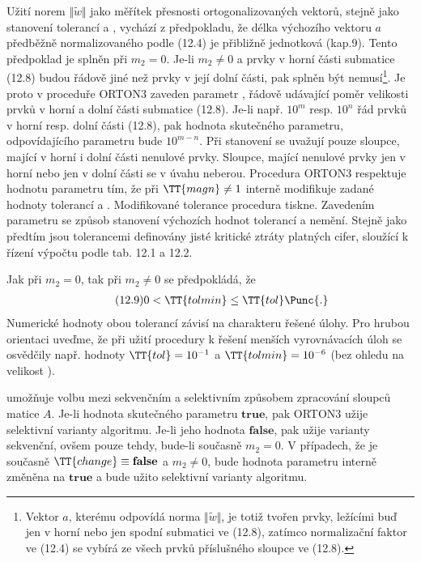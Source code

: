 Užití norem $\Vert\widetilde w\Vert$ jako měřítek přesnosti
ortogonalizovaných vektorů, stejně jako stanovení tolerancí 
a , vychází z předpokladu, že délka výchozího vektoru $a$
předběžně normalizovaného podle (12.4) je přibližně jednotková
(kap.9). Tento předpoklad je splněn při $m_2=0$. Je-li $m_2\ne0$
a prvky v horní části submatice (12.8) budou řádově jiné než prvky
v její dolní
části, pak splněn být nemusí\footnote
{
Vektor $a$, kterému odpovídá norma $\Vert\widetilde w\Vert$,
je totiž tvořen prvky, ležícími buď jen v horní nebo jen spodní
submatici ve (12.8), zatímco normalizační faktor ve (12.4)
se vybírá ze všech prvků příslušného sloupce ve (12.8).
}.
%
Je proto v proceduře ORTON3 zaveden
%
 parametr
, řádově udávající poměr velikosti prvků v horní
a dolní části submatice (12.8). Je-li např. $10^m$ resp. $10^n$ řád
prvků v horní resp. dolní části (12.8), pak hodnota skutečného
parametru, odpovídajícího parametru  bude $10^{m-n}$.  Při
stanovení  se uvažují pouze sloupce, mající v horní i dolní
části nenulové prvky. Sloupce, mající nenulové prvky jen v horní nebo
jen v dolní části se v úvahu neberou. Procedura ORTON3 respektuje
hodnotu parametru  tím, že při $\TT{magn}\ne1$ interně
modifikuje zadané hodnoty tolerancí 
a . Modifikované tolerance procedura tiskne. Zavedením
parametru  se způsob stanovení výchozích hodnot
tolerancí  a  nemění.  Stejně jako předtím jsou
tolerancemi definovány jisté kritické ztráty platných cifer, sloužící
k řízení výpočtu podle tab. 12.1 a 12.2.


Jak při $m_2=0$, tak při $m_2\ne0$ se předpokládá, že
%
\begin{align*}
   \tag{12.9}  0 < \TT{tolmin} \le \TT{tol}\Punc{.}
\end{align*}
%
Numerické hodnoty obou tolerancí závisí na charakteru řešené
úlohy. Pro hrubou orientaci uveďme, že při užití procedury k řešení
menších vyrovnávacích úloh se osvědčily např. hodnoty
$\TT{tol}=10^{-1}$ a $\TT{tolmin}=10^{-6}$ (bez ohledu na
velikost ).



umožňuje volbu mezi sekvenčním a selektivním
způsobem zpracování sloupců matice $A$. Je-li hodnota skutečného
parametru $\mathbf{true}$, pak ORTON3 užije selektivní varianty
algoritmu.  Je-li
jeho hodnota $\mathbf{false}$, pak užije varianty sekvenční,
ovšem pouze tehdy,
bude-li současně $m_2=0$. V případech, že je současně
$\TT{change} \equiv \mathbf{false}$ a
$m_2\ne0$, bude hodnota parametru  interně změněna na
$\mathbf{true}$ a bude
užito selektivní varianty algoritmu.


